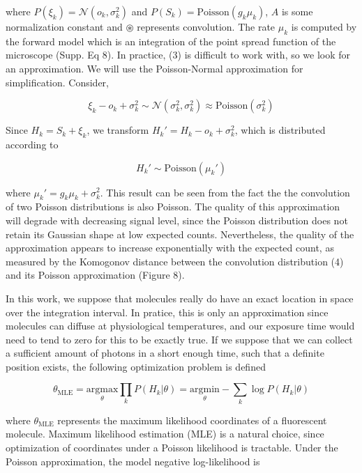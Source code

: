 \documentclass{ucetd}
\begin{document}
where $P(\xi_{k}) = \mathcal{N}(o_{k},\sigma_{k}^{2})$ and $P(S_{k}) = \mathrm{Poisson}(g_{k}\mu_{k})$,  $A$ is some normalization constant and $\circledast$ represents convolution. The rate $\mu_{k}$ is computed by the forward model which is an integration of the point spread function of the microscope (Supp. Eq 8). In practice, (3) is difficult to work with, so we look for an approximation. We will use the Poisson-Normal approximation for simplification. Consider,

\begin{equation*}
\xi_{k} - o_{k} + \sigma_{k}^{2} \sim \mathcal{N}(\sigma_{k}^{2},\sigma_{k}^{2}) \approx \mathrm{Poisson}(\sigma_{k}^{2})
\end{equation*}

Since $H_{k} = S_{k} + \xi_{k}$, we transform $H_{k}' = H_{k} - o_{k} + \sigma_{k}^{2}$, which is distributed according to 

\begin{equation*}
H_{k}' \sim \mathrm{Poisson}(\mu_{k}')
\end{equation*}

where $\mu_{k}' = g_{k}\mu_{k} + \sigma_{k}^{2}$. This result can be seen from the fact the the convolution of two Poisson distributions is also Poisson. The quality of this approximation will degrade with decreasing signal level, since the Poisson distribution does not retain its Gaussian shape at low expected counts. Nevertheless, the quality of the approximation appears to increase exponentially with the expected count, as measured by the Komogonov distance between the convolution distribution (4) and its Poisson approximation (Figure 8).

In this work, we suppose that molecules really do have an exact location in space over the integration interval. In pratice, this is only an approximation since molecules can diffuse at physiological temperatures, and our exposure time would need to tend to zero for this to be exactly true. If we suppose that we can collect a sufficient amount of photons in a short enough time, such that a definite position exists, the following optimization problem is defined

\begin{equation*}
\theta_{\mathrm{MLE}} = \underset{\theta}{\mathrm{argmax}}\prod_{k}P(H_{k}|\theta)= \underset{\theta}{\mathrm{argmin}}-\sum_{k}\log P(H_{k}|\theta)
\end{equation*}


where $\theta_{\mathrm{MLE}}$ represents the maximum likelihood coordinates of a fluorescent molecule. Maximum likelihood estimation (MLE) is a natural choice, since optimization of coordinates under a Poisson likelihood is tractable. Under the Poisson approximation, the model negative log-likelihood is
\end{document}
